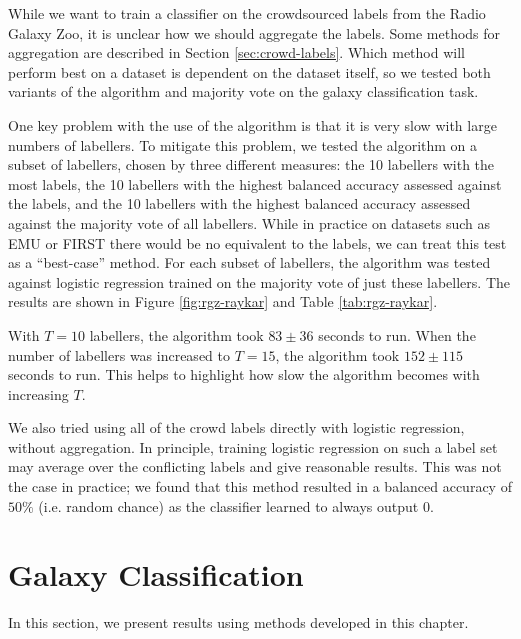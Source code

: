   While we want to train a classifier on the crowdsourced labels from the Radio
  Galaxy Zoo, it is unclear how we should aggregate the labels. Some methods for
  aggregation are described in Section \ref{sec:crowd-labels}. Which method will
  perform best on a dataset is dependent on the dataset itself, so we tested
  both variants of the \citeauthor{raykar10} algorithm and majority vote on the
  galaxy classification task.

  One key problem with the use of the \citeauthor{raykar10} algorithm is that it
  is very slow with large numbers of labellers. To mitigate this problem, we
  tested the algorithm on a subset of labellers, chosen by three different
  measures: the 10 labellers with the most labels, the 10 labellers with the
  highest balanced accuracy assessed against the \citeauthor{norris06} labels,
  and the 10 labellers with the highest balanced accuracy assessed against the
  majority vote of all labellers. While in practice on datasets such as EMU or
  FIRST there would be no equivalent to the \citeauthor{norris06} labels, we can
  treat this test as a ``best-case'' method. For each subset of labellers, the
  \citeauthor{raykar10} algorithm was tested against logistic regression trained
  on the majority vote of just these labellers. The results are shown in Figure
  \ref{fig:rgz-raykar} and Table \ref{tab:rgz-raykar}.

  With $T = 10$ labellers, the \citeauthor{raykar10} algorithm took $83 \pm 36$
  seconds to run. When the number of labellers was increased to $T = 15$, the
  \citeauthor{raykar10} algorithm took $152 \pm 115$ seconds to run. This helps
  to highlight how slow the algorithm becomes with increasing $T$.

  We also tried using all of the crowd labels directly with logistic regression,
  without aggregation. In principle, training logistic regression on such a
  label set may average over the conflicting labels and give reasonable results.
  This was not the case in practice; we found that this method resulted in a
  balanced accuracy of $50\%$ (i.e. random chance) as the classifier learned to
  always output 0.

\section{Galaxy Classification}
\label{sec:rgz-results}

  In this section, we present results using methods developed in this chapter.

